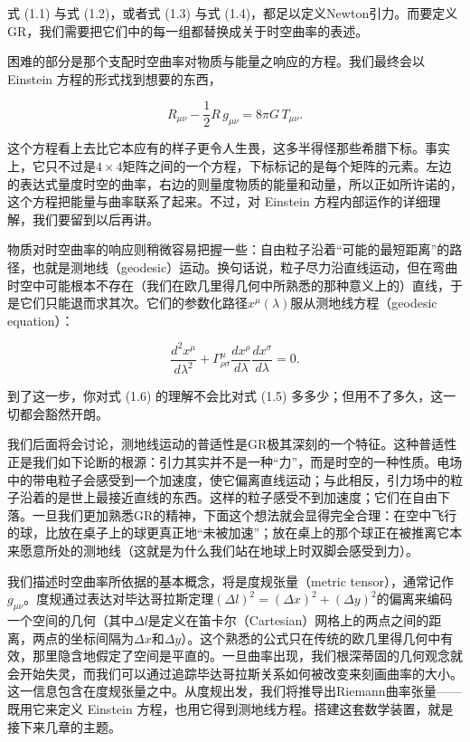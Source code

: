 式 (1.1) 与式 (1.2)，或者式 (1.3) 与式 (1.4)，都足以定义Newton引力。而要定义GR，我们需要把它们中的每一组都替换成关于时空曲率的表述。

困难的部分是那个支配时空曲率对物质与能量之响应的方程。我们最终会以 Einstein 方程的形式找到想要的东西，

\begin{equation*}
R_{\mu\nu} - \frac{1}{2}R\,g_{\mu\nu} = 8\pi G\,T_{\mu\nu}.
\tag{1.5}
\end{equation*}

这个方程看上去比它本应有的样子更令人生畏，这多半得怪那些希腊下标。事实上，它只不过是$4\times4$矩阵之间的一个方程，下标标记的是每个矩阵的元素。左边的表达式量度时空的曲率，右边的则量度物质的能量和动量，所以正如所许诺的，这个方程把能量与曲率联系了起来。不过，对 Einstein 方程内部运作的详细理解，我们要留到以后再讲。

物质对时空曲率的响应则稍微容易把握一些：自由粒子沿着“可能的最短距离”的路径，也就是测地线（geodesic）运动。换句话说，粒子尽力沿直线运动，但在弯曲时空中可能根本不存在（我们在欧几里得几何中所熟悉的那种意义上的）直线，于是它们只能退而求其次。它们的参数化路径$x^\mu(\lambda)$服从测地线方程（geodesic equation）：

\begin{equation*}
\frac{d^2x^\mu}{d\lambda^2} + \Gamma^\mu_{\rho\sigma}\frac{dx^\rho}{d\lambda}\frac{dx^\sigma}{d\lambda} = 0.
\tag{1.6}
\end{equation*}

到了这一步，你对式 (1.6) 的理解不会比对式 (1.5) 多多少；但用不了多久，这一切都会豁然开朗。

我们后面将会讨论，测地线运动的普适性是GR极其深刻的一个特征。这种普适性正是我们如下论断的根源：引力其实并不是一种“力”，而是时空的一种性质。电场中的带电粒子会感受到一个加速度，使它偏离直线运动；与此相反，引力场中的粒子沿着的是世上最接近直线的东西。这样的粒子感受不到加速度；它们在自由下落。一旦我们更加熟悉GR的精神，下面这个想法就会显得完全合理：在空中飞行的球，比放在桌子上的球更真正地“未被加速”；放在桌上的那个球正在被推离它本来愿意所处的测地线（这就是为什么我们站在地球上时双脚会感受到力）。

我们描述时空曲率所依据的基本概念，将是度规张量（metric tensor），通常记作$g_{\mu\nu}$。度规通过表达对毕达哥拉斯定理$(\Delta l)^2=(\Delta x)^2+(\Delta y)^2$的偏离来编码一个空间的几何（其中$\Delta l$是定义在笛卡尔（Cartesian）网格上的两点之间的距离，两点的坐标间隔为$\Delta x$和$\Delta y$）。这个熟悉的公式只在传统的欧几里得几何中有效，那里隐含地假定了空间是平直的。一旦曲率出现，我们根深蒂固的几何观念就会开始失灵，而我们可以通过追踪毕达哥拉斯关系如何被改变来刻画曲率的大小。这一信息包含在度规张量之中。从度规出发，我们将推导出Riemann曲率张量——既用它来定义 Einstein 方程，也用它得到测地线方程。搭建这套数学装置，就是接下来几章的主题。

